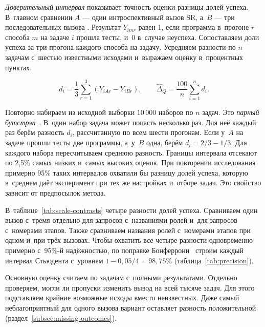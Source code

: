 \emph{Доверительный интервал} показывает точность оценки разницы долей успеха. В~главном сравнении $A$ --- один интроспективный вызов SR, а~$B$ --- три последовательных вызова \MultiCallRole{}. Результат $Y_{imr}$ равен 1, если программа в~прогоне $r$ способа $m$ на задаче $i$ прошла тесты, и~0 в~случае неуспеха. Сопоставляем доли успеха за три прогона каждого способа на задачу. Усредняем разности по $n$ задачам с~шестью известными исходами и~выражаем оценку в~процентных пунктах.
\begin{formulakey}
\[
 d_i=\frac{1}{3}\sum_{r=1}^{3}(Y_{iAr}-Y_{iBr}),
 \qquad \widehat{\Delta}_Q=\frac{100}{n}\sum_{i=1}^{n}d_i.
\]
\begin{symbols}
\end{symbols}
\end{formulakey}
Повторно набираем из исходной выборки 10\,000 наборов по $n$ задач. Это \emph{парный бутстрэп}~\cite{efron1986bootstrap}. В~один набор задача может попасть несколько раз. Для неё каждый раз берём разность $d_i$, рассчитанную по всем шести прогонам. Если у~$A$ на задаче прошли тесты две программы, а~у~$B$ одна, берём $d_i=2/3-1/3$. Для каждого набора пересчитываем среднюю разность. Границы интервала отсекают по 2,5\% самых низких и~самых высоких оценок. При повторении исследования примерно 95\% таких интервалов охватили бы разницу долей успеха, которую в~среднем даёт эксперимент при тех же настройках и~отборе задач. Это свойство зависит от предпосылок метода.

В~таблице~\ref{tab:scale-contrasts} четыре разности долей успеха. Сравниваем один вызов с~тремя отдельно для запросов с~названиями ролей и~для запросов с~номерами этапов. Также сравниваем названия ролей с~номерами этапов при одном и~при трёх вызовах. Чтобы охватить все четыре разности одновременно примерно с~95\%-й надёжностью, по поправке Бонферрони~\cite{nistbonferroni} строим каждый интервал Стьюдента с~уровнем $1-0{,}05/4=98{,}75\%$ (таблица~\ref{tab:precision}).

Основную оценку считаем по задачам с~полными результатами. Отдельно проверяем, могли ли пропуски изменить вывод на всей тысяче задач. Для этого подставляем крайние возможные исходы вместо неизвестных. Даже самый неблагоприятный для одного вызова вариант оставляет разность положительной (раздел~\ref{subsec:missing-outcomes}).

